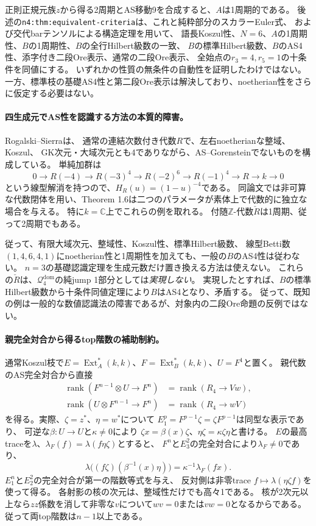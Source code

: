 \documentclass[11pt,a4paper]{ltjsarticle}
\newcommand{\Ext}{\operatorname{Ext}}
\begin{document}
正則正規元族$z$から得る2周期とAS移動9を合成すると、$A$は1周期的である。
後述の\texttt{n4:thm:equivalent-criteria}は、これと純粋部分のスカラーEuler式、
および交代barテンソルによる構造定理を用いて、
語長Koszul性、$N=6$、$A$の1周期性、$B$の1周期性、$B$の全行Hilbert級数の一致、
$B$の標準Hilbert級数、$B$のAS4性、添字付き二段Ore表示、通常の二段Ore表示、
全始点の$r_3=4,r_5=1$の十条件を同値にする。
いずれかの性質の無条件の自動性を証明したわけではない。
一方、標準枝の基礎AS4性と第二段Ore表示は解決しており、noetherian性をさらに仮定する必要はない。

\paragraph{四生成元でAS性を認識する方法の本質的障害。}
Rogalski--Sierra\cite[Theorem 1.1, (1.2), Theorem 1.6]{RSsurface}は、
通常の連結次数付き代数$R$で、左右noetherianな整域、Koszul、
GK次元・大域次元とも4でありながら、AS--Gorensteinでないものを構成している。
単純加群は
\[
0\longrightarrow R(-4)\longrightarrow R(-3)^4
\longrightarrow R(-2)^6\longrightarrow R(-1)^4
\longrightarrow R\longrightarrow k\longrightarrow0
\]
という線型解消を持つので、$H_R(u)=(1-u)^{-4}$である。
同論文では非可算な代数閉体を用い、Theorem 1.6は二つのパラメータが素体上で代数的に独立な場合を与える。
特に$k=\mathbb C$上でこれらの例を取れる。
付随$\mathbb Z$-代数$\check R$は1周期、従って2周期でもある。

従って、有限大域次元、整域性、Koszul性、標準Hilbert級数、
線型Betti数$(1,4,6,4,1)$にnoetherian性と1周期性を加えても、一般の$B$のAS4性は従わない。
$n=3$の基礎認識定理を生成元数だけ置き換える方法は使えない。
これらの$\check R$は、$\mathcal Q_4^{\mathrm{dom}}$の純jump 1部分としては\emph{実現しない}。
実現したとすれば、$B$の標準Hilbert級数から十条件同値定理により$B$はAS4となり、矛盾する。
従って、既知の例は一般的な数値認識法の障害であるが、対象内の二段Ore命題の反例ではない。

\paragraph{親完全対合から得るtop階数の補助制約。}
通常Koszul枝で$E=\Ext_A^*(k,k)$、$F=\Ext_B^*(k,k)$、$U=F^1$と置く。
親代数のAS完全対合から直接
\begin{align*}
\operatorname{rank}(F^{n-1}\otimes U\longrightarrow F^n)
 &=\operatorname{rank}(R_4\longrightarrow Vw),\\
\operatorname{rank}(U\otimes F^{n-1}\longrightarrow F^n)
 &=\operatorname{rank}(R_4\longrightarrow wV)
\end{align*}
を得る。実際、$\zeta=z^*$、$\eta=w^*$について
$E^p_1=F^{p-1}\zeta=\zeta F^{p-1}$は同型な表示であり、
可逆な$\beta:U\to U$と$\kappa\ne0$により
$\zeta x=\beta(x)\zeta$、$\eta\zeta=\kappa\zeta\eta$と書ける。
$E$の最高traceを$\lambda$、$\lambda_F(f)=\lambda(f\eta\zeta)$とすると、
$F^n$と$E^2_3$の完全対合により$\lambda_F\ne0$であり、
\[
\lambda\bigl((f\zeta)(\beta^{-1}(x)\eta)\bigr)
=\kappa^{-1}\lambda_F(fx).
\]
$E^n_1$と$E^2_2$の完全対合が第一の階数等式を与え、
反対側は非零trace $f\mapsto\lambda(\eta\zeta f)$を使って得る。
各射影の核の次元は、整域性だけでも高々1である。
核が2次元以上なら$zz$係数を消して非零な$v$について$wv=0$または$vw=0$となるからである。
従って両top階数は$n-1$以上である。
\end{document}
